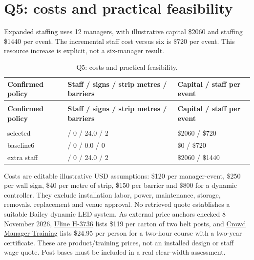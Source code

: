 \documentclass[11pt,a4paper]{article}
\begin{document}
\section{Q5: costs and practical feasibility}

Expanded staffing uses 12 managers, with illustrative capital \$2060 and staffing \$1440 per event. The incremental staff cost versus six is \$720 per event. This resource increase is explicit, not a six-manager result.


\begingroup\small
\begin{longtable}{@{}>{\raggedright\arraybackslash}p{}>{\raggedright\arraybackslash}p{}>{\raggedright\arraybackslash}p{}@{}}
\caption{Q5: costs and practical feasibility.}\label{tab:27}\\
\toprule
\textbf{Confirmed policy} & \textbf{Staff / signs / strip metres / barriers} & \textbf{Capital / staff per event} \\
\midrule\endfirsthead
\multicolumn{3}{l}{\small\itshape Table \thetable{} continued}\\\toprule
\textbf{Confirmed policy} & \textbf{Staff / signs / strip metres / barriers} & \textbf{Capital / staff per event} \\
\midrule\endhead
\midrule\multicolumn{3}{r}{\small Continued on next page}\\\endfoot
\bottomrule\endlastfoot
selected & 6 / 0 / 24.0 / 2 & \$2060 / \$720 \\
baseline6 & 6 / 0 / 0.0 / 0 & \$0 / \$720 \\
extra staff & 12 / 0 / 24.0 / 2 & \$2060 / \$1440 \\
\end{longtable}\endgroup

Costs are editable illustrative USD assumptions: \$120 per manager-event, \$250 per wall sign, \$40 per metre of strip, \$150 per barrier and \$800 for a dynamic controller. They exclude installation labor, power, maintenance, storage, removals, replacement and venue approval. No retrieved quote establishes a suitable Bailey dynamic LED system. As external price anchors checked 8 November 2026, \href{https://www.uline.com/BL_8917/Retractable-Crowd-Control?keywords=PL-S}{Uline H-3736} lists \$119 per carton of two belt posts, and \href{https://crowdmanagers.com/purchase/}{Crowd Manager Training} lists \$24.95 per person for a two-hour course with a two-year certificate. These are product/training prices, not an installed design or staff wage quote. Post bases must be included in a real clear-width assessment.
\end{document}

